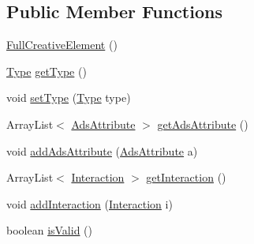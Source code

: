 \subsection*{Public Member Functions}
\begin{DoxyCompactItemize}
\item 
\hyperlink{classcom_1_1bluevia_1_1ad_1_1data_1_1FullCreativeElement_adbe8c49ecb21ec3abbd5a30f70a9a4b9}{FullCreativeElement} ()
\item 
\hyperlink{classcom_1_1bluevia_1_1ad_1_1data_1_1FullCreativeElement_a1a64b29ff50d01119bbaf6fee4e3f4f4}{Type} \hyperlink{classcom_1_1bluevia_1_1ad_1_1data_1_1FullCreativeElement_a1c4543e596d652971f2bf31fc482b4e1}{getType} ()
\item 
void \hyperlink{classcom_1_1bluevia_1_1ad_1_1data_1_1FullCreativeElement_aba6a3d0889a0e187982bce2600005c60}{setType} (\hyperlink{classcom_1_1bluevia_1_1ad_1_1data_1_1FullCreativeElement_a1a64b29ff50d01119bbaf6fee4e3f4f4}{Type} type)
\item 
ArrayList$<$ \hyperlink{classcom_1_1bluevia_1_1ad_1_1data_1_1AdsAttribute}{AdsAttribute} $>$ \hyperlink{classcom_1_1bluevia_1_1ad_1_1data_1_1FullCreativeElement_ae411bfae3ef1a85df83a7bfe4a211cbf}{getAdsAttribute} ()
\item 
void \hyperlink{classcom_1_1bluevia_1_1ad_1_1data_1_1FullCreativeElement_a0e23e5a1b3298bc394725921122833d3}{addAdsAttribute} (\hyperlink{classcom_1_1bluevia_1_1ad_1_1data_1_1AdsAttribute}{AdsAttribute} a)
\item 
ArrayList$<$ \hyperlink{classcom_1_1bluevia_1_1ad_1_1data_1_1Interaction}{Interaction} $>$ \hyperlink{classcom_1_1bluevia_1_1ad_1_1data_1_1FullCreativeElement_a4b33064243547e50de60f472c216c4b4}{getInteraction} ()
\item 
void \hyperlink{classcom_1_1bluevia_1_1ad_1_1data_1_1FullCreativeElement_a1e06225436849bfd704f81745a13ec30}{addInteraction} (\hyperlink{classcom_1_1bluevia_1_1ad_1_1data_1_1Interaction}{Interaction} i)
\item 
boolean \hyperlink{classcom_1_1bluevia_1_1ad_1_1data_1_1FullCreativeElement_a38b2b48d346232b3a8736e31a980ef36}{isValid} ()
\end{DoxyCompactItemize}


